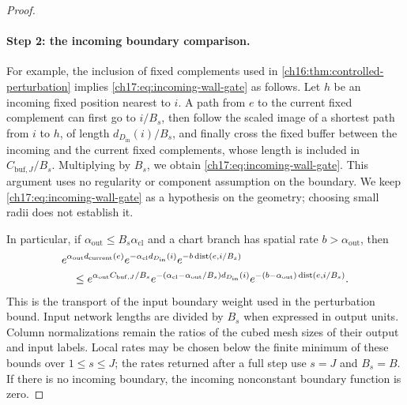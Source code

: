 \begin{proof}
\paragraph{Step 2: the incoming boundary comparison.}
For example, the inclusion of fixed complements used in \cref{ch16:thm:controlled-perturbation} implies \eqref{ch17:eq:incoming-wall-gate} as follows. Let $h$ be an incoming fixed position nearest to $i$. A path from $e$ to the current fixed complement can first go to $i/B_s$, then follow the scaled image of a shortest path from $i$ to $h$, of length $d_{D_{\mathrm{in}}}(i)/B_s$, and finally cross the fixed buffer between the incoming and the current fixed complements, whose length is included in $C_{\mathrm{buf},J}/B_s$. Multiplying by $B_s$, we obtain \eqref{ch17:eq:incoming-wall-gate}. This argument uses no regularity or component assumption on the boundary. We keep \eqref{ch17:eq:incoming-wall-gate} as a hypothesis on the geometry; choosing small radii does not establish it.

In particular, if $\alpha_{\mathrm{out}}\le B_s\alpha_{\mathrm{cl}}$ and a chart branch has spatial rate $b>\alpha_{\mathrm{out}}$, then
\begin{align*}
 &e^{\alpha_{\mathrm{out}}d_{\mathrm{current}}(e)}e^{-\alpha_{\mathrm{cl}}d_{D_{\mathrm{in}}}(i)}e^{-b\operatorname{dist}(e,i/B_s)}\\
 &\quad\le e^{\alpha_{\mathrm{out}}C_{\mathrm{buf},J}/B_s}e^{-(\alpha_{\mathrm{cl}}-\alpha_{\mathrm{out}}/B_s)d_{D_{\mathrm{in}}}(i)}e^{-(b-\alpha_{\mathrm{out}})\operatorname{dist}(e,i/B_s)}.
\end{align*}
This is the transport of the input boundary weight used in the perturbation bound. Input network lengths are divided by $B_s$ when expressed in output units. Column normalizations remain the ratios of the cubed mesh sizes of their output and input labels. Local rates may be chosen below the finite minimum of these bounds over $1\le s\le J$; the rates returned after a full step use $s=J$ and $B_s=B$. If there is no incoming boundary, the incoming nonconstant boundary function is zero.


\end{proof}
